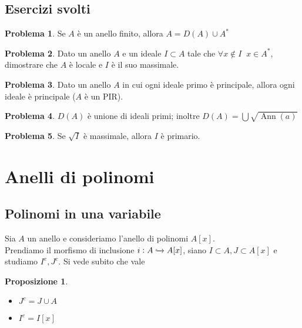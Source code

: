 \documentclass[a4paper,10pt]{article}
\theoremstyle{plain}
\newtheorem{prop}[thm]{Proposizione}
\theoremstyle{definition}
\newtheorem{prob}{Problema}[section]
\DeclareMathOperator{\ann}{Ann}
\begin{document}
\subsection{Esercizi svolti}
\begin{prob}
    Se $A$ è un anello finito, allora $A=D(A)\cup A^\ast$
\end{prob}

\begin{prob}
    Dato un anello $A$ e un ideale $I\subset A$ tale che $\forall x\not\in I\;\;x\in A^\ast$, dimostrare che $A$ è locale e $I$ è il suo massimale.
\end{prob}

\begin{prob}
    Dato un anello $A$ in cui ogni ideale primo è principale, allora ogni ideale è principale ($A$ è un PIR).
\end{prob}

\begin{prob}
    $D(A)$ è unione di ideali primi; inoltre $D(A)=\bigcup\sqrt{\ann(a)}$
\end{prob}

\begin{prob}
    Se $\sqrt I$ è massimale, allora $I$ è primario.
\end{prob}




\section{Anelli di polinomi}

\subsection{Polinomi in una variabile}
Sia $A$ un anello e consideriamo l'anello di polinomi $A[x]$.\\
Prendiamo il morfismo di inclusione $i:A\xhookrightarrow{} A[x]$, siano $I\subset A, J\subset A[x]$ e studiamo $I^e,J^c$. Si vede subito che vale
\begin{prop}
    $ $
    \begin{itemize}
        \item $J^c=J\cup A$
        \item $I^e=I[x]$
    \end{itemize}
\end{prop}
\end{document}
